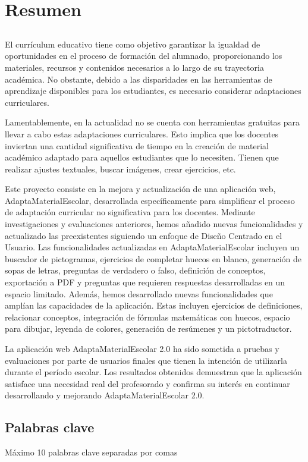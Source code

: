 \chapter*{Resumen}

\section*{\tituloPortadaVal}

El currículum educativo tiene como objetivo garantizar la igualdad de oportunidades en el proceso de formación del alumnado, proporcionando los materiales, recursos y contenidos necesarios a lo largo de su trayectoria académica. No obstante, debido a las disparidades en las herramientas de aprendizaje disponibles para los estudiantes, es necesario considerar adaptaciones curriculares.

Lamentablemente, en la actualidad no se cuenta con herramientas gratuitas para llevar a cabo estas adaptaciones curriculares. Esto implica que los docentes inviertan una cantidad significativa de tiempo en la creación de material académico adaptado para aquellos estudiantes que lo necesiten. Tienen que realizar ajustes textuales, buscar imágenes, crear ejercicios, etc.

Este proyecto consiste en la mejora y actualización de una aplicación web, AdaptaMaterialEscolar, desarrollada específicamente para simplificar el proceso de adaptación curricular no significativa para los docentes. Mediante investigaciones y evaluaciones anteriores, hemos añadido nuevas funcionalidades y actualizado las preexistentes siguiendo un enfoque de Diseño Centrado en el Usuario. Las funcionalidades actualizadas en AdaptaMaterialEscolar incluyen un buscador de pictogramas, ejercicios de completar huecos en blanco, generación de sopas de letras, preguntas de verdadero o falso, definición de conceptos, exportación a PDF y preguntas que requieren respuestas desarrolladas en un espacio limitado. Además, hemos desarrollado nuevas funcionalidades que amplían las capacidades de la aplicación. Estas incluyen ejercicios de definiciones, relacionar conceptos, integración de fórmulas matemáticas con huecos, espacio para dibujar, leyenda de colores, generación de resúmenes y un pictotraductor.

La aplicación web AdaptaMaterialEscolar 2.0 ha sido sometida a pruebas y evaluaciones por parte de usuarios finales que tienen la intención de utilizarla durante el período escolar. Los resultados obtenidos demuestran que la aplicación satisface una necesidad real del profesorado y confirma su interés en continuar desarrollando y mejorando AdaptaMaterialEscolar 2.0.


\section*{Palabras clave}
   
\noindent Máximo 10 palabras clave separadas por comas

   


